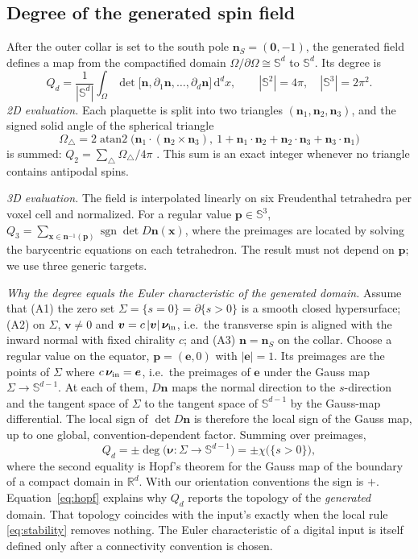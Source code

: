 \documentclass[11pt,a4paper]{article}
\newcommand{\nn}{\bm n}
\newcommand{\vv}{\bm v}
\newcommand{\dd}{\mathrm{d}}
\newcommand{\Sn}{\mathbb S}
\begin{document}
\subsection{Degree of the generated spin field}\label{subsec:degree}
After the outer collar is set to the south pole $\bm n_S=(\bm0,-1)$, the generated field defines a map from the compactified domain $\Omega/\partial\Omega\cong\Sn^d$ to $\Sn^d$. Its degree is
\begin{equation}
 Q_d=\frac1{|\Sn^d|}\int_\Omega\det\bigl[\nn,\partial_1\nn,\dots,\partial_d\nn\bigr]\,\dd^dx,\qquad |\Sn^2|=4\pi,\quad |\Sn^3|=2\pi^2 .
 \label{eq:degree}
\end{equation}
\emph{2D evaluation.} Each plaquette is split into two triangles $(\nn_1,\nn_2,\nn_3)$, and the signed solid angle of the spherical triangle
\begin{equation}
 \Omega_\triangle=2\operatorname{atan2}\bigl(\nn_1\cdot(\nn_2\times\nn_3),\ 1+\nn_1\!\cdot\nn_2+\nn_2\!\cdot\nn_3+\nn_3\!\cdot\nn_1\bigr)
 \label{eq:solidangle}
\end{equation}
is summed: $Q_2=\sum_\triangle\Omega_\triangle/4\pi$ \cite{Berg1981}. This sum is an exact integer whenever no triangle contains antipodal spins.

\emph{3D evaluation.} The field is interpolated linearly on six Freudenthal tetrahedra per voxel cell and normalized. For a regular value $\bm p\in\Sn^3$, $Q_3=\sum_{\bm x\in\nn^{-1}(\bm p)}\operatorname{sgn}\det D\nn(\bm x)$, where the preimages are located by solving the barycentric equations on each tetrahedron. The result must not depend on $\bm p$; we use three generic targets.

\emph{Why the degree equals the Euler characteristic of the generated domain.} Assume that (A1) the zero set $\Sigma=\{s=0\}=\partial\{s>0\}$ is a smooth closed hypersurface; (A2) on $\Sigma$, $\vv\neq0$ and $\vv=c\,|\vv|\,\bm\nu_{\rm in}$, i.e.\ the transverse spin is aligned with the inward normal with fixed chirality $c$; and (A3) $\nn=\nn_S$ on the collar. Choose a regular value on the equator, $\bm p=(\bm e,0)$ with $|\bm e|=1$. Its preimages are the points of $\Sigma$ where $c\,\bm\nu_{\rm in}=\bm e$, i.e.\ the preimages of $\bm e$ under the Gauss map $\Sigma\to\Sn^{d-1}$. At each of them, $D\nn$ maps the normal direction to the $s$-direction and the tangent space of $\Sigma$ to the tangent space of $\Sn^{d-1}$ by the Gauss-map differential. The local sign of $\det D\nn$ is therefore the local sign of the Gauss map, up to one global, convention-dependent factor. Summing over preimages,
\begin{equation}
 Q_d=\pm\deg\bigl(\bm\nu:\Sigma\to\Sn^{d-1}\bigr)=\pm\chi\bigl(\{s>0\}\bigr),
 \label{eq:hopf}
\end{equation}
where the second equality is Hopf's theorem for the Gauss map of the boundary of a compact domain in $\mathbb R^d$. With our orientation conventions the sign is $+$. Equation~\eqref{eq:hopf} explains why $Q_d$ reports the topology of the \emph{generated} domain. That topology coincides with the input's exactly when the local rule \eqref{eq:stability} removes nothing. The Euler characteristic of a digital input is itself defined only after a connectivity convention is chosen.
\end{document}
